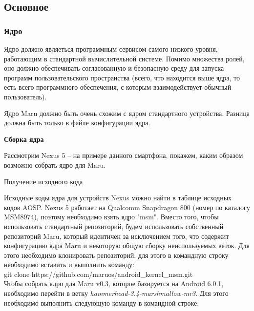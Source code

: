 \documentclass[a4paper, 14pt]{article}
\begin{document}

\subsection{Основное}

\subsubsection{Ядро}

\par Ядро должно являеться программным сервисом самого низкого уровня, работающим в стандартной вычислительной системе. Помимо множества ролей, оно должно обеспечивать согласованную и безопасную среду для запуска программ пользовательского пространства (всего, что находится выше ядра, то есть всего программного обеспечения, с которым взаимодействует обычный пользователь).

\par Ядро Maru должно быть очень схожим с ядром стандартного устройства. Разница должна быть только в файле конфигурации ядра.

\textbf{Сборка ядра}

\par Рассмотрим Nexus 5 -- на примере данного смартфона, покажем, каким образом возможно собрать ядро для Maru.

\par Получение исходного кода

\par Исходные коды ядра для устройств Nexus можно найти в таблице исходных кодов AOSP.
Nexus 5 работает на Qualcomm Snapdragon 800 (номер по каталогу MSM8974), поэтому необходимо взять ядро "msm".
Вместо того, чтобы использовать стандартный репозиторий, будем использовать собственный репозиторий Maru, который идентичен за исключением того, что содержит конфигурацию ядра Maru и некоторую общую cборку неиспользуемых веток. Для этого необходимо клонировать репозиторий, для этого в командную строку необходимо вставить и выполнить команду: \\

git clone https://github.com/maruos/android\_kernel\_msm.git \\ 

Чтобы собрать ядро для Maru v0.3, которое базируется на Android 6.0.1, необходимо перейти в ветку \textit{hammerhead-3.4-marshmallow-mr3}. Для этого необходимо выполнить следующую команду в командной строке: \\
\end{document}
